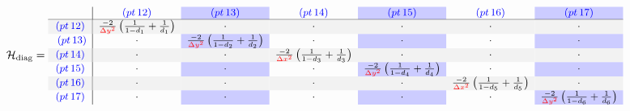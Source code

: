 \documentclass[10pt,a4paper, landscape]{article}
\newcommand{\centre}[2]{\frac{-2}{\textcolor{red}{#1}}\left(\frac{1}{1-#2}+\frac{1}{#2}\right)}
\newcommand{\pnormal}[1]{\textcolor{blue}{(pt\,#1)}}
\newcommand{\pgray}[1]{\rowcolor{gray!10}\textcolor{blue}{(pt\,#1)}}
\newcommand{\dx}{\Delta x}
\newcommand{\dy}{\Delta y}
\begin{document}

\begin{equation*}\small
\mathcal{H}_{\text{diag}} = 
\begin{array}{c|c>{\columncolor{blue!20}}cc>{\columncolor{blue!20}}cc>{\columncolor{blue!20}}c}
& \pnormal{12} & \pnormal{13} & \pnormal{14} & \pnormal{15} & \pnormal{16} & \pnormal{17}\\
\hline
\pgray{12} &\centre{\dy^2}{d_1} & \cdot & \cdot & \cdot & \cdot & \cdot\\\
\pnormal{13} & \cdot & \centre{\dy^2}{d_2} & \cdot & \cdot & \cdot & \cdot \\
\pgray{14} & \cdot & \cdot & \centre{\dx^2}{d_3} & \cdot & \cdot & \cdot \\
\pnormal{15} & \cdot & \cdot & \cdot & \centre{\dy^2}{d_4} & \cdot & \cdot \\
\pgray{16} & \cdot & \cdot & \cdot & \cdot & \centre{\dx^2}{d_5} & \cdot \\
\pnormal{17} & \cdot & \cdot & \cdot & \cdot & \cdot & \centre{\dy^2}{d_6} \\
\end{array}
\end{equation*}
\vspace{2cm}
\end{document}
